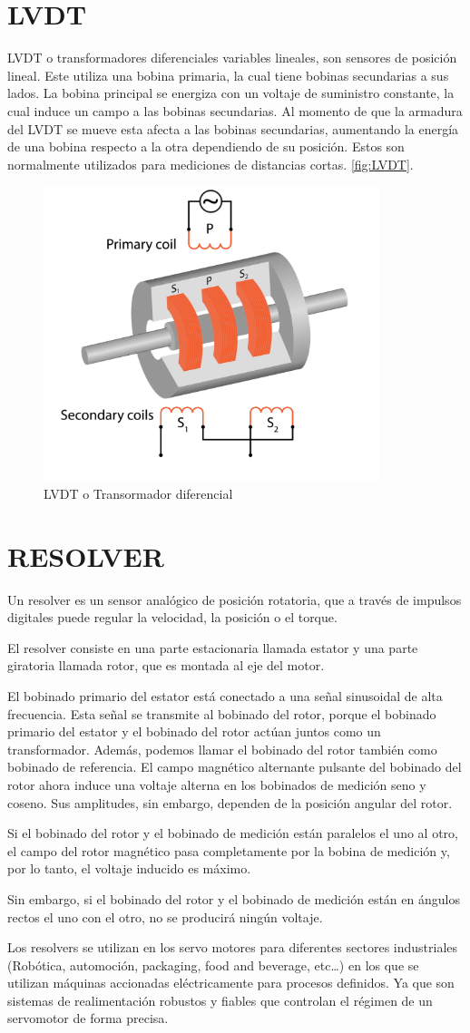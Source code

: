 \section{LVDT}
LVDT o transformadores diferenciales variables lineales, son sensores de posición lineal. Este\cite{Dewesoft_LVDT} utiliza una bobina primaria, la cual tiene bobinas secundarias a sus lados. La bobina principal se energiza con un voltaje de suministro constante, la cual induce un campo a las bobinas secundarias. Al momento de que la armadura del LVDT se mueve esta afecta a las bobinas secundarias, aumentando la energía de una bobina respecto a la otra dependiendo de su posición. Estos son normalmente utilizados para mediciones de distancias cortas. \autoref{fig:LVDT}.

\begin{figure}[h]
	\centering
	\includegraphics[width=0.3\linewidth]{img/LVDT}
	\caption{LVDT o Transormador diferencial}
	\label{fig:LVDT}
\end{figure}

\section{RESOLVER}
Un resolver\cite{ServoMotors_Resolver} es un sensor analógico de posición rotatoria, que a través de impulsos digitales puede regular la velocidad, la posición o el torque.

El resolver consiste en una parte estacionaria llamada estator y una parte giratoria llamada rotor, que es montada al eje del motor.

El bobinado primario del estator está conectado a una señal sinusoidal de alta frecuencia. Esta señal se transmite al bobinado del rotor, porque el bobinado primario del estator y el bobinado del rotor actúan juntos como un transformador. Además, podemos llamar el bobinado del rotor también como bobinado de referencia.
El campo magnético alternante pulsante del bobinado del rotor ahora induce una voltaje alterna en los bobinados de medición seno y coseno. Sus amplitudes, sin embargo, dependen de la posición angular del rotor.

Si el bobinado del rotor y el bobinado de medición están paralelos el uno al otro, el campo del rotor magnético pasa completamente por la bobina de medición y, por lo tanto, el voltaje inducido es máximo.

Sin embargo, si el bobinado del rotor y el bobinado de medición están en ángulos rectos el uno con el otro, no se producirá ningún voltaje.

Los resolvers se utilizan en los servo motores para diferentes sectores industriales (Robótica, automoción, packaging, food and beverage, etc…) en los que se utilizan máquinas accionadas eléctricamente para procesos definidos. Ya que son sistemas de realimentación robustos y fiables que controlan el régimen de un servomotor de forma precisa.